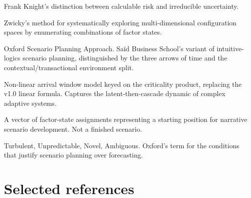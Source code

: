 \documentclass[11pt,a4paper]{article}
\begin{document}
\begin{description}[leftmargin=2.5cm, style=nextline]
  \item[Knightian Uncertainty] Frank Knight's distinction between calculable risk and irreducible uncertainty.
  \item[Morphological Analysis] Zwicky's method for systematically exploring multi-dimensional configuration spaces by enumerating combinations of factor states.
  \item[OSPA] Oxford Scenario Planning Approach. Saïd Business School's variant of intuitive-logics scenario planning, distinguished by the three arrows of time and the contextual/transactional environment split.
  \item[Saturating sigmoid arrival] Non-linear arrival window model keyed on the criticality product, replacing the v1.0 linear formula. Captures the latent-then-cascade dynamic of complex adaptive systems.
  \item[Seed] A vector of factor-state assignments representing a starting position for narrative scenario development. Not a finished scenario.
  \item[TUNA] Turbulent, Unpredictable, Novel, Ambiguous. Oxford's term for the conditions that justify scenario planning over forecasting.
\end{description}

\section*{Selected references}
\end{document}
